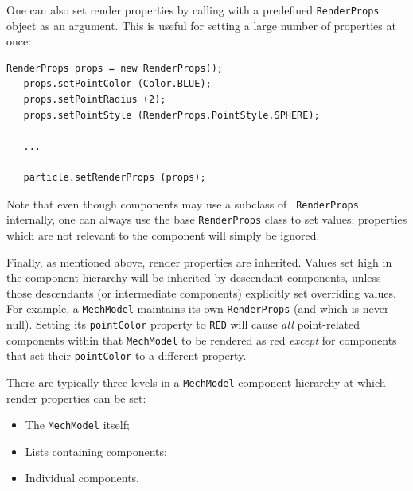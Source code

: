 One can also set render properties by calling
 with a
predefined {\tt RenderProps} object as an argument. This is useful for
setting a large number of properties at once:
%
\begin{lstlisting}[]
   RenderProps props = new RenderProps();
   props.setPointColor (Color.BLUE);
   props.setPointRadius (2);
   props.setPointStyle (RenderProps.PointStyle.SPHERE);

   ...

   particle.setRenderProps (props);
\end{lstlisting}

\begin{sideblock}
Note that even though components may use a subclass of {\tt
RenderProps} internally, one can always use the base {\tt RenderProps}
class to set values; properties which are not relevant to the
component will simply be ignored.
\end{sideblock}

Finally, as mentioned above, render properties are inherited.  Values
set high in the component hierarchy will be inherited by descendant
components, unless those descendants (or intermediate components)
explicitly set overriding values.  For example, a {\tt MechModel}
maintains its own {\tt RenderProps} (and which is never null). Setting
its {\tt pointColor} property to {\tt RED} will cause {\it all}
point-related components within that {\tt MechModel} to be rendered as
red {\it except} for components that set their {\tt pointColor} to a
different property.

There are typically three levels in a {\tt MechModel} component
hierarchy at which render properties can be set:

\begin{itemize}

\item The {\tt MechModel} itself;

\item Lists containing components;

\item Individual components.

\end{itemize}

